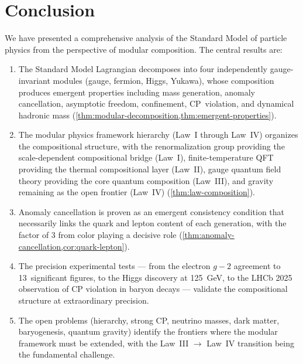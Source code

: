 \documentclass[12pt]{article}
\theoremstyle{definition}
\theoremstyle{remark}
\begin{document}
\section{Conclusion}
\label{sec:conclusion}

We have presented a comprehensive analysis of the Standard Model of particle physics from the perspective of modular composition. The central results are:

\begin{enumerate}
\item The Standard Model Lagrangian decomposes into four independently gauge-invariant modules (gauge, fermion, Higgs, Yukawa), whose composition produces emergent properties including mass generation, anomaly cancellation, asymptotic freedom, confinement, CP~violation, and dynamical hadronic mass (\cref{thm:modular-decomposition,thm:emergent-properties}).

\item The modular physics framework hierarchy (Law~I through Law~IV) organizes the compositional structure, with the renormalization group providing the scale-dependent compositional bridge (Law~I), finite-temperature QFT providing the thermal compositional layer (Law~II), gauge quantum field theory providing the core quantum composition (Law~III), and gravity remaining as the open frontier (Law~IV) (\cref{thm:law-composition}).

\item Anomaly cancellation is proven as an emergent consistency condition that necessarily links the quark and lepton content of each generation, with the factor of 3 from color playing a decisive role (\cref{thm:anomaly-cancellation,cor:quark-lepton}).

\item The precision experimental tests --- from the electron $g-2$ agreement to 13~significant figures, to the Higgs discovery at 125~GeV, to the LHCb 2025 observation of CP violation in baryon decays --- validate the compositional structure at extraordinary precision.

\item The open problems (hierarchy, strong CP, neutrino masses, dark matter, baryogenesis, quantum gravity) identify the frontiers where the modular framework must be extended, with the Law~III $\to$ Law~IV transition being the fundamental challenge.
\end{enumerate}
\end{document}
